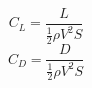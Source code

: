 \begin{multicols}{2}
    \noindent
    \begin{equation}
        C_L = \frac{L}{\frac{1}{2}\rho V^2 S}
    \end{equation}
    \begin{equation}
        C_D = \frac{D}{\frac{1}{2}\rho V^2 S}
    \end{equation}
\end{multicols}